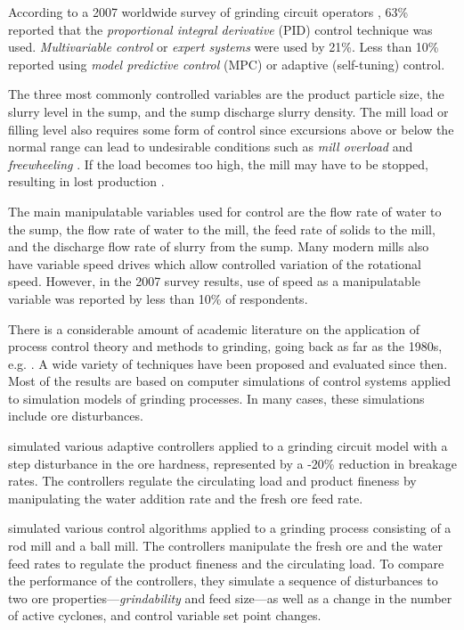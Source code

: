According to a 2007 worldwide survey of grinding circuit operators \citep{wei_grinding_2009}, 63\% reported that the \textit{proportional integral derivative} (PID) control technique was used. \textit{Multivariable control} or \textit{expert systems} were used by 21\%. Less than 10\% reported using \textit{model predictive control} (MPC) or adaptive (self-tuning) control.

The three most commonly controlled variables are the product particle size, the slurry level in the sump, and the sump discharge slurry density. The mill load or filling level also requires some form of control since excursions above or below the normal range can lead to undesirable conditions such as \textit{mill overload} and \textit{freewheeling} \citep{mcclure_overload_2015}. If the load becomes too high, the mill may have to be stopped, resulting in lost production \citep{wei_grinding_2009}.

The main manipulatable variables used for control are the flow rate of water to the sump, the flow rate of water to the mill, the feed rate of solids to the mill, and the discharge flow rate of slurry from the sump. Many modern mills also have variable speed drives which allow controlled variation of the rotational speed. However, in the 2007 survey results, use of speed as a manipulatable variable was reported by less than 10\% of respondents.

There is a considerable amount of academic literature on the application of process control theory and methods to grinding, going back as far as the 1980s, e.g. \cite{herbst_optimal_1988}. A wide variety of techniques have been proposed and evaluated since then. Most of the results are based on computer simulations of control systems applied to simulation models of grinding processes. In many cases, these simulations include ore disturbances.

\cite{najim_adaptive_1995} simulated various adaptive controllers applied to a grinding circuit model with a step disturbance in the ore hardness, represented by a -20\% reduction in breakage rates. The controllers regulate the circulating load and product fineness by manipulating the water addition rate and the fresh ore feed rate.

\cite{pomerleau_survey_2000} simulated various control algorithms applied to a grinding process consisting of a rod mill and a ball mill. The controllers manipulate the fresh ore and the water feed rates to regulate the product fineness and the circulating load. To compare the performance of the controllers, they simulate a sequence of disturbances to two ore properties---\textit{grindability} and feed size---as well as a change in the number of active cyclones, and control variable set point changes.

